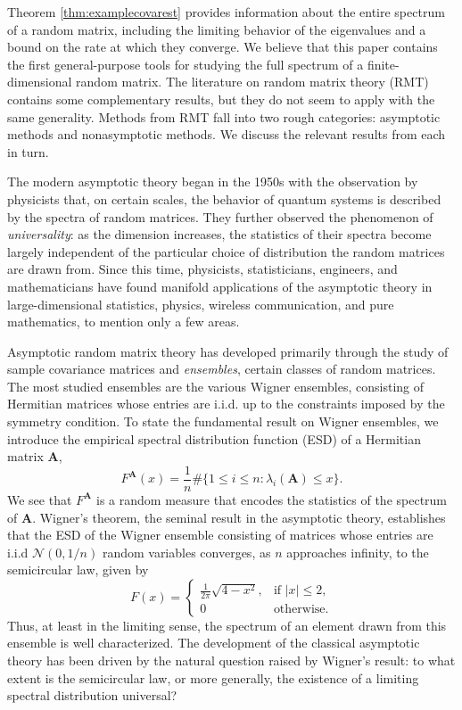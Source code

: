 \documentclass[11pt,letterpaper,twoside,reqno,nosumlimits]{amsart}
\newcommand{\mat}[1]{\ensuremath{\bm{#1}}} %
\theoremstyle{remark}
\numberwithin{equation}{section}
\numberwithin{thm}{section}
\numberwithin{prop}{section}
\numberwithin{defn}{section}
\numberwithin{remark}{section}
\begin{document}
Theorem \ref{thm:examplecovarest} provides information about the entire spectrum of a random matrix, including the limiting behavior of the eigenvalues and a bound on the rate at which they converge. We believe that this paper contains the first general-purpose tools for studying the full spectrum of a finite-dimensional random matrix. The literature on random matrix theory (RMT) contains some complementary results, but they do not seem to apply with the same generality. Methods from RMT fall into two rough categories: asymptotic methods and nonasymptotic methods. We discuss the relevant results from each in turn.

The modern asymptotic theory began in the 1950s with the observation by physicists that, on certain scales, the behavior of quantum systems is described by the spectra of random matrices. They further observed the phenomenon of \emph{universality}: as the dimension increases, the statistics of their spectra become largely independent of the particular choice of distribution the random matrices are drawn from. Since this time, physicists, statisticians, engineers, and mathematicians have found manifold applications of the asymptotic theory in large-dimensional statistics, physics, wireless communication, and pure mathematics, to mention only a few areas. 

Asymptotic random matrix theory has developed primarily through the study of sample covariance matrices and \emph{ensembles}, certain classes of random matrices. The most studied ensembles are the various Wigner ensembles, consisting of Hermitian matrices whose entries are i.i.d. up to the constraints imposed by the symmetry condition. To state the fundamental result on Wigner ensembles, we introduce the empirical spectral distribution function (ESD) of a Hermitian matrix $\mat{A}$,
\[
F^{\mat{A}}(x) = \frac{1}{n} \#\{ 1 \leq i \leq n : \lambda_i(\mat{A}) \leq x \}.
\]
We see that $F^{\mat{A}}$ is a random measure that encodes the statistics of the spectrum of $\mat{A}.$ Wigner's theorem, the seminal result in the asymptotic theory, establishes that the ESD of the Wigner ensemble consisting of matrices whose entries are i.i.d $\mathcal{N}(0, 1/n)$ random variables converges, as $n$ approaches infinity, to the semicircular law, given by 
\[
F(x) = \begin{cases}
\frac{1}{2\pi}\sqrt{4 - x^2}, & \text{if } |x| \leq 2, \\
0 & \text{otherwise.}
\end{cases}
\] 
Thus, at least in the limiting sense, the spectrum of an element drawn from this ensemble is well characterized. The development of the classical asymptotic theory has been driven by the natural question raised by Wigner's result: to what extent is the semicircular law, or more generally, the existence of a limiting spectral distribution universal?
\end{document}
